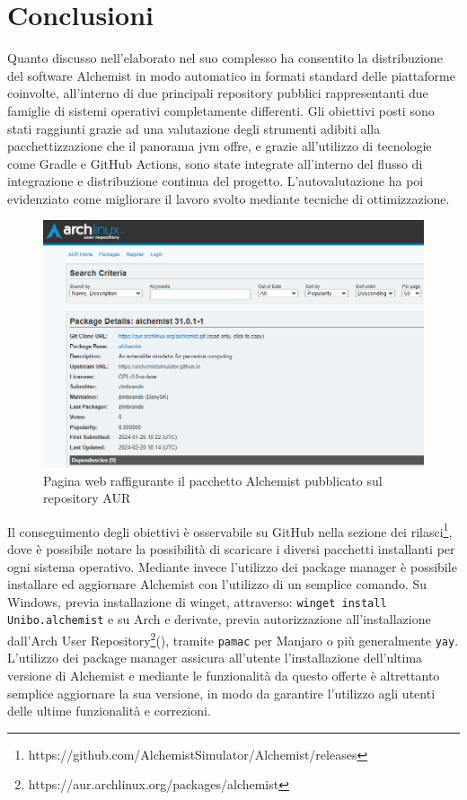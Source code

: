 
\chapter{Conclusioni}
Quanto discusso nell'elaborato nel suo complesso ha consentito la distribuzione del software Alchemist in modo automatico in formati standard delle piattaforme coinvolte, all'interno di due principali repository pubblici rappresentanti due famiglie di sistemi operativi completamente differenti. Gli obiettivi posti sono stati raggiunti grazie ad una valutazione degli strumenti adibiti alla pacchettizzazione che il panorama \ac{jvm} offre, e grazie all'utilizzo di tecnologie come Gradle e GitHub Actions, sono state integrate all'interno del flusso di integrazione e distribuzione continua del progetto. L'autovalutazione ha poi evidenziato come migliorare il lavoro svolto mediante tecniche di ottimizzazione.

\begin{figure}[htb]
	\centering
	\includegraphics[width=.8\linewidth]{figures/alchemist-aur.png}
	\caption{Pagina web raffigurante il pacchetto Alchemist pubblicato sul repository AUR}
	\label{fig:aur-web}
\end{figure}

Il conseguimento degli obiettivi è osservabile su GitHub nella sezione dei rilasci\footnote{https://github.com/AlchemistSimulator/Alchemist/releases}, dove è possibile notare la possibilità di scaricare i diversi pacchetti installanti per ogni sistema operativo. Mediante invece l'utilizzo dei package manager è possibile installare ed aggiornare Alchemist con l'utilizzo di un semplice comando. Su Windows, previa installazione di winget, attraverso:
\texttt{winget install Unibo.alchemist}
e su Arch e derivate, previa autorizzazione all'installazione dall'Arch User Repository\footnote{https://aur.archlinux.org/packages/alchemist}(), tramite \texttt{pamac} per Manjaro o più generalmente \texttt{yay}.
L'utilizzo dei package manager assicura all'utente l'installazione dell'ultima versione di Alchemist e mediante le funzionalità da questo offerte è altrettanto semplice aggiornare la sua versione, in modo da garantire l'utilizzo agli utenti delle ultime funzionalità e correzioni. 

